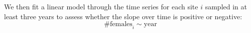 \documentclass[12pt, oneside]{article}   	%
\begin{document}
We then fit a linear model through the time series for each site $i$ sampled in at least three years to assess whether the slope over time is positive or negative:  %
\begin{equation}
\text{\# females}_i \sim \text{year}
\end{equation}






\end{document}

